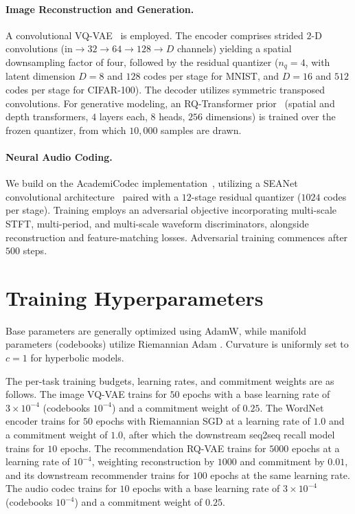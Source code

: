 \documentclass[12pt]{report}
\begin{document}
\paragraph{Image Reconstruction and Generation.} A convolutional VQ-VAE~\cite{vqvae} is employed. The encoder comprises strided $2$-D convolutions ($\text{in}\to32\to64\to128\to D$ channels) yielding a spatial downsampling factor of four, followed by the residual quantizer ($n_q=4$, with latent dimension $D=8$ and $128$ codes per stage for MNIST, and $D=16$ and $512$ codes per stage for CIFAR-100). The decoder utilizes symmetric transposed convolutions. For generative modeling, an RQ-Transformer prior~\cite{lee2022rqvae} (spatial and depth transformers, $4$ layers each, $8$ heads, $256$ dimensions) is trained over the frozen quantizer, from which $10{,}000$ samples are drawn.

\paragraph{Neural Audio Coding.} We build on the AcademiCodec implementation~\cite{academicodec}, utilizing a SEANet convolutional architecture~\cite{soundstream,encodec} paired with a $12$-stage residual quantizer ($1024$ codes per stage). Training employs an adversarial objective incorporating multi-scale STFT, multi-period, and multi-scale waveform discriminators, alongside reconstruction and feature-matching losses. Adversarial training commences after $500$ steps.

\section{Training Hyperparameters}
\label{sec:hparams}

Base parameters are generally optimized using AdamW, while manifold parameters (codebooks) utilize Riemannian Adam \cite{geoopt}. Curvature is uniformly set to $c=1$ for hyperbolic models.

The per-task training budgets, learning rates, and commitment weights are as follows. The image VQ-VAE trains for $50$ epochs with a base learning rate of $3\times10^{-4}$ (codebooks $10^{-4}$) and a commitment weight of $0.25$. The WordNet encoder trains for $50$ epochs with Riemannian SGD at a learning rate of $1.0$ and a commitment weight of $1.0$, after which the downstream seq2seq recall model trains for $10$ epochs. The recommendation RQ-VAE trains for $5000$ epochs at a learning rate of $10^{-4}$, weighting reconstruction by $1000$ and commitment by $0.01$, and its downstream recommender trains for $100$ epochs at the same learning rate. The audio codec trains for $10$ epochs with a base learning rate of $3\times10^{-4}$ (codebooks $10^{-4}$) and a commitment weight of $0.25$.
\end{document}
